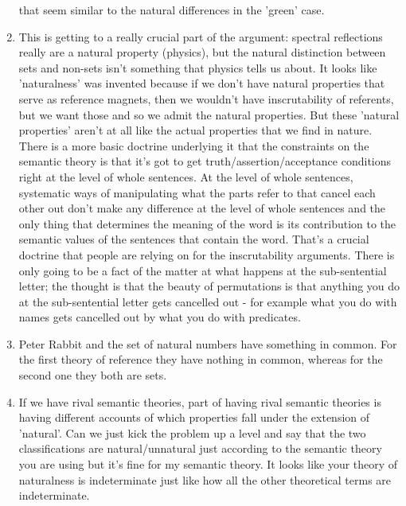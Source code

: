 \documentclass[12pt]{article}
\theoremstyle{definition}
\begin{document}
\begin{enumerate}
        that seem similar to the natural differences in the 'green' case. 
    \item
        This is getting to a really crucial part of the argument: spectral
        reflections really are a natural property (physics), but the natural
        distinction between sets and non-sets isn't something that physics
        tells us about. It looks like 'naturalness' was invented because if we
        don't have natural properties that serve as reference magnets, then we
        wouldn't have inscrutability of referents, but we want those and so we
        admit the natural properties. But these 'natural properties' aren't at
        all like the actual properties that we find in nature. There is a more
        basic doctrine underlying it that the constraints on the semantic
        theory is that it's got to get truth/assertion/acceptance conditions
        right at the level of whole sentences. At the level of whole sentences,
        systematic ways of manipulating what the parts refer to that cancel
        each other out don't make any difference at the level of whole
        sentences and the only thing that determines the meaning of the word is
        its contribution to the semantic values of the sentences that contain
        the word. That's a crucial doctrine that people are relying on for the
        inscrutability arguments. There is only going to be a fact of the
        matter at what happens at the sub-sentential letter; the thought is
        that the beauty of permutations is that anything you do at the
        sub-sentential letter gets cancelled out - for example what you do with
        names gets cancelled out by what you do with predicates. 
    \item
        Peter Rabbit and the set of natural numbers have something in common.
        For the first theory of reference they have nothing in common, whereas
        for the second one they both are sets. 
    \item
        If we have rival semantic theories, part of having rival semantic
        theories is having different accounts of which properties fall under
        the extension of 'natural'. Can we just kick the problem up a level and
        say that the two classifications are natural/unnatural just according
        to the semantic theory you are using but it's fine for my semantic
        theory. It looks like your theory of naturalness is indeterminate just
        like how all the other theoretical terms are indeterminate.

\end{enumerate}
\end{document}
